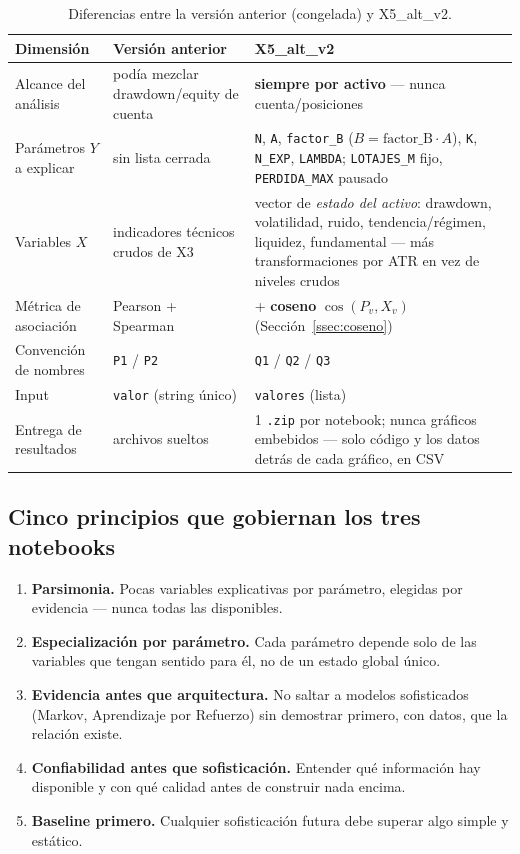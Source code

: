 \documentclass[11pt,a4paper]{article}
\newcommand{\code}[1]{\texttt{\small #1}}
\begin{document}
\begin{table}[h]
\centering
\small
\begin{tabularx}{\linewidth}{@{}l X X@{}}
\toprule
\textbf{Dimensión} & \textbf{Versión anterior} & \textbf{X5\_alt\_v2} \\
\midrule
Alcance del análisis & podía mezclar drawdown/equity de cuenta & \textbf{siempre por
  activo} — nunca cuenta/posiciones \\
Parámetros \(Y\) a explicar & sin lista cerrada & \code{N}, \code{A}, \code{factor\_B}
  (\(B=\text{factor\_B}\cdot A\)), \code{K}, \code{N\_EXP}, \code{LAMBDA};
  \code{LOTAJES\_M} fijo, \code{PERDIDA\_MAX} pausado \\
Variables \(X\) & indicadores técnicos crudos de X3 & vector de \emph{estado del activo}:
  drawdown, volatilidad, ruido, tendencia/régimen, liquidez, fundamental — más
  transformaciones por ATR en vez de niveles crudos \\
Métrica de asociación & Pearson + Spearman & + \textbf{coseno} \(\cos(P_v,X_v)\)
  (Sección~\ref{ssec:coseno}) \\
Convención de nombres & \code{P1} / \code{P2} & \code{Q1} / \code{Q2} / \code{Q3} \\
Input & \code{valor} (string único) & \code{valores} (lista) \\
Entrega de resultados & archivos sueltos & 1 \code{.zip} por notebook; nunca gráficos
  embebidos — solo código y los datos detrás de cada gráfico, en CSV \\
\bottomrule
\end{tabularx}
\caption{Diferencias entre la versión anterior (congelada) y X5\_alt\_v2.}
\label{tab:v1-v2}
\end{table}

\subsection{Cinco principios que gobiernan los tres notebooks}

\begin{enumerate}[leftmargin=1.4em,itemsep=2pt]
\item \textbf{Parsimonia.} Pocas variables explicativas por parámetro, elegidas por
  evidencia — nunca todas las disponibles.
\item \textbf{Especialización por parámetro.} Cada parámetro depende solo de las variables
  que tengan sentido para él, no de un estado global único.
\item \textbf{Evidencia antes que arquitectura.} No saltar a modelos sofisticados (Markov,
  Aprendizaje por Refuerzo) sin demostrar primero, con datos, que la relación existe.
\item \textbf{Confiabilidad antes que sofisticación.} Entender qué información hay
  disponible y con qué calidad antes de construir nada encima.
\item \textbf{Baseline primero.} Cualquier sofisticación futura debe superar algo simple y
  estático.
\end{enumerate}
\end{document}

